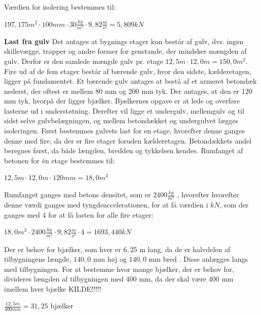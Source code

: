 Værdien for isolering bestemmes til:
\begin{center}
	$197,\!175 m^2\cdot 100 mm\cdot 30 \frac{kg}{m^3}\cdot 9,\!82 \frac{m}{s^2}=5,\!809 kN$
\end{center}

\textbf{Last fra gulv}
\newline
Det antages at bygnings etager kun består af gulv, dvs. ingen skillevægge, trapper og andre former for genstande, der mindsker mængden af gulv. Derfor er den samlede mængde gulv pr. etage $12,\!5 m\cdot 12,\!0 m=150,\!0 m^2$.
\newline \indent{     }  Fire ud af de fem etager består af bærende gulv, hvor den sidste, kælderetagen, ligger på fundamentet. Et bærende gulv antages at bestå af et armeret betondæk nederst, der oftest er mellem 80 mm og 200 mm tyk. Der antages, at den er 120 mm tyk, hvorpå der ligger bjælker. Bjælkernes opgave er at lede og overføre lasterne ud i understøtning. Derefter vil ligge et undergulv, mellemgulv og til sidst selve gulvbelægningen, og mellem betondækket og undergulvet lægges isoleringen. 
\newline \indent{     }  Først bestemmes gulvets last for en etage, hvorefter denne ganges denne med fire, da der er fire etager foruden kælderetagen. Betondækkets andel beregnes først, da både længden, bredden og tykkelsen kendes. 
\newline
\newline
Rumfanget af betonen for én etage bestemmes til:
\begin{center}
	$12,\!5 m\cdot 12,\!0 m\cdot 120 mm=18,\!0 m^3$
\end{center}

Rumfanget ganges med betons densitet, som er $2400 \frac{kg}{m^3}$ \citep{}, hvorefter hvorefter denne værdi ganges med tyngdeaccelerationen, for at få værdien i $kN$, som der ganges med 4 for at få lasten for alle fire etager:
\begin{center}
	$18,\!0 m^3\cdot 2400 \frac{kg}{m^3}\cdot 9,82 \frac{m}{s^2}\cdot 4=1693,440 kN$
\end{center}

Der er behov for bjælker, som hver er $6,\!25$ m lang, da de er halvdelen af tilbygningens længde, $140,\!0$ mm høj og $140,\!0$ mm bred \citep{granse}. Disse anlægges langs med tilbygningen. For at bestemme hvor mange bjælker, der er behov for, divideres længden af tilbygningen med 400 mm, da der skal være 400 mm imellem hver bjælke KILDE!!!!!
\begin{center}
	$\frac{12,\!5 m}{400 mm}=31,\!25$ bjælker
\end{center} 


